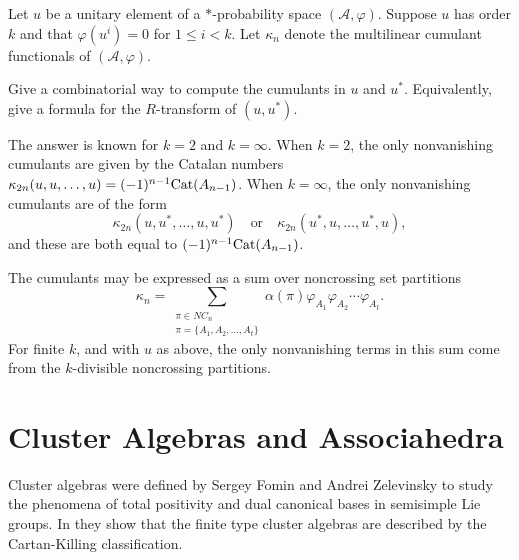 \documentclass[12pt,letterpaper, reqno]{amsart}
\newcommand{\Cat}{{\rm Cat}}
\newcommand{\A}{\mathcal A}
\begin{document}
\begin{problemblock}
\begin{problem} \label{prob:kdivisible} Let $u$ be a unitary element of a $*$-probability space $(\A,\varphi)$. Suppose $u$ has order $k$ and that $\varphi(u^i)=0$ for $1\leq i< k$. Let $\kappa_n$ denote the multilinear cumulant functionals of $(\A,\varphi)$.

Give a combinatorial way to compute the cumulants in $u$ and $u^*$. Equivalently, give a formula for the $R$-transform of $(u,u^*)$.
\end{problem}

\begin{remark} The answer is known for $k=2$ and $k=\infty$. When $k=2$, the only nonvanishing cumulants are given by the Catalan numbers $\kappa_{2n}(u,u,\ldots,u)=(-1)^{n-1} \Cat(A_{n-1})$. When $k=\infty$, the only nonvanishing cumulants are of the form
\begin{equation*}
\kappa_{2n}(u,u^*,\ldots,u,u^*)\quad\text{or}\quad \kappa_{2n}(u^*,u,\ldots,u^*,u),
\end{equation*}
 and these are both equal to $(-1)^{n-1}\Cat(A_{n-1})$.
\end{remark}
\begin{remark} The cumulants may be expressed as a sum over noncrossing set partitions
\begin{equation*}
\kappa_n = \sum_{\substack{\pi\in NC_n\\ \pi=\{A_1,A_2,\ldots,A_t\}}} \alpha(\pi) \varphi_{A_1}\varphi_{A_2}\cdots \varphi_{A_t}.
\end{equation*}
For finite $k$, and with $u$ as above, the only nonvanishing terms in this sum come from the $k$-divisible noncrossing partitions.
\end{remark}

\end{problemblock}

\section{Cluster Algebras and Associahedra}
\label{sec:cluster}
Cluster algebras were defined by Sergey Fomin and Andrei Zelevinsky to study the phenomena of total positivity and dual canonical bases in semisimple Lie groups. In \cite{fomin-zelevinsky:finitetype} they show that the finite type cluster algebras are described by the Cartan-Killing classification.
\end{document}
